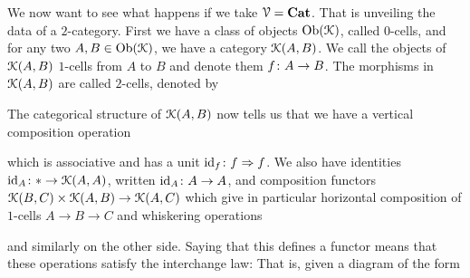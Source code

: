 \documentclass[a4paper,11pt,oneside,openany]{scrbook}
\begin{document}
\begin{exmp}
	We now want to see what happens if we take $\operatorname{\mathcal{V}} = {\normalfont\textbf{Cat}}$. That is unveiling the data of a $2$-category. First we have a class of objects
	$\operatorname{Ob}(\operatorname{\mathcal{K}})$, called $0$-cells, and for any two $A,B \in \operatorname{Ob}(\operatorname{\mathcal{K}})$, we have a category $\operatorname{\mathcal{K}}(A,B)$. We call the objects of $\operatorname{\mathcal{K}}(A,B)$ $1$-cells from $A$
	to $B$ and denote them $f \colon A \to B$. The morphisms in $\operatorname{\mathcal{K}}(A,B)$ are called $2$-cells, denoted by
	\begin{center}
	\end{center}
	The categorical structure of $\operatorname{\mathcal{K}}(A,B)$ now tells us that we have a vertical composition operation
	\begin{center}
	\end{center}
	which is associative and has a unit $\operatorname{id}_{f} \colon f \Rightarrow f$. We also have identities $\operatorname{id}_{A} \colon \ast \to \operatorname{\mathcal{K}}(A,A)$, written $\operatorname{id}_{A} \colon A \to A$, and
	composition functors $\operatorname{\mathcal{K}}(B,C) \times \operatorname{\mathcal{K}}(A,B) \to \operatorname{\mathcal{K}}(A,C)$ which give in particular horizontal composition of $1$-cells $A \to B \to C$ and whiskering operations
	\begin{center}
	\end{center}
	and similarly on the other side. Saying that this defines a functor means that these operations satisfy the interchange law: That is, given a diagram of the
	form
	\begin{center}
\end{center}
\end{exmp}
\end{document}
